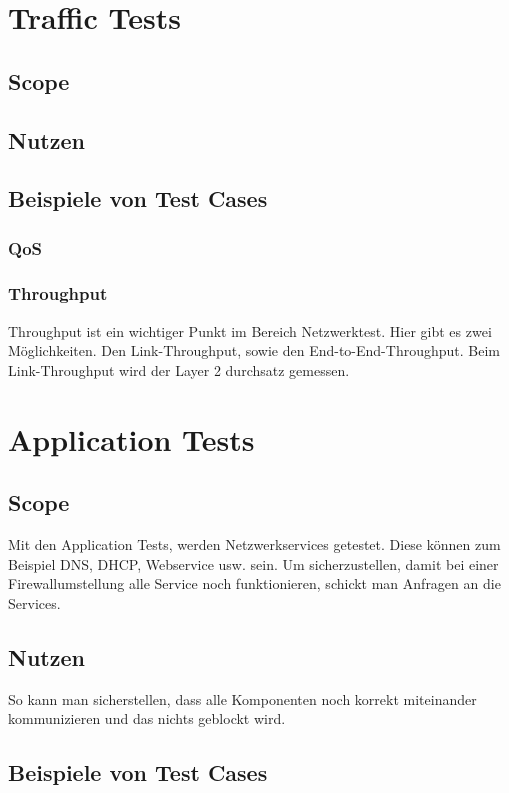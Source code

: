 \documentclass[a4,12pt]{scrartcl}
\begin{document}
\section{Traffic Tests}
\subsection{Scope}
\subsection{Nutzen}
\subsection{Beispiele von Test Cases}
\subsubsection{QoS}
\subsubsection{Throughput}
Throughput ist ein wichtiger Punkt im Bereich Netzwerktest. Hier gibt es zwei Möglichkeiten. Den Link-Throughput, sowie den End-to-End-Throughput.
Beim Link-Throughput wird der Layer 2 durchsatz gemessen. 



\section{Application Tests}
\subsection{Scope}
Mit den Application Tests, werden Netzwerkservices getestet. Diese können zum Beispiel DNS, DHCP, Webservice usw. sein.
Um sicherzustellen, damit bei einer Firewallumstellung alle Service noch funktionieren, schickt man Anfragen an die Services.
\subsection{Nutzen}
So kann man sicherstellen, dass alle Komponenten noch korrekt miteinander kommunizieren und das nichts geblockt wird.

\subsection{Beispiele von Test Cases}
\end{document}
